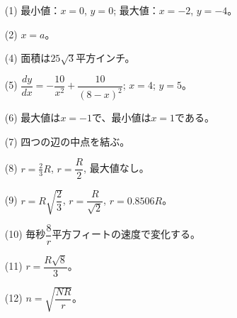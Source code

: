 \documentclass[a4paper,11pt,openany]{ltjsbook}
\begin{document}
\begin{enumerate}
\item[(1)] 最小値：$x = 0$, $y = 0$; 最大値：$x = -2$, $y = -4$。

\item[(2)] $x = a$。

\item[(4)] 面積は$25 \sqrt{3}$平方インチ。

\item[(5)] $\dfrac{dy}{dx} = - \dfrac{10}{x^2} + \dfrac{10}{(8 - x)^2}$; $x = 4$; $y = 5$。

\item[(6)] 最大値は$x = -1$で、最小値は$x = 1$である。

\item[(7)] 四つの辺の中点を結ぶ。

\item[(8)] $r = \frac{2}{3} R$, $r = \dfrac{R}{2}$, 最大値なし。

\item[(9)] $r = R \sqrt{\dfrac{2}{3}}$, $r = \dfrac{R}{\sqrt{2}}$, $r = 0.8506R$。

\item[(10)] 毎秒$\dfrac{8}{r}$平方フィートの速度で変化する。

\item[(11)] $r = \dfrac{R \sqrt{8}}{3}$。
\item[(12)] $n = \sqrt{\dfrac{NR}{r}}$。
\par\smallskip

\end{enumerate}
\par\bigskip\noindent{\Large\bfseries [演習 X の解答]}\par\smallskip
\end{document}
